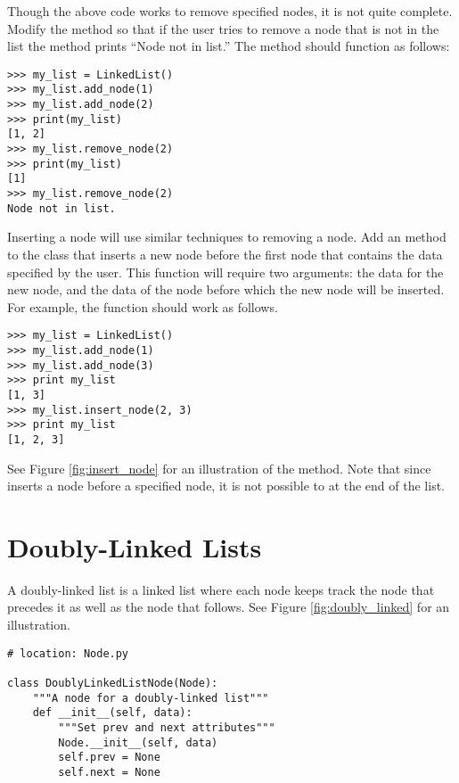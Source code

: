 \begin{problem}
Though the above code works to remove specified nodes, it is not quite complete.
Modify the  method so that if the user tries to remove a node that is not in the list the method prints ``Node not in list.''
The method should function as follows:
\begin{lstlisting}
>>> my_list = LinkedList()
>>> my_list.add_node(1)
>>> my_list.add_node(2)
>>> print(my_list)
[1, 2]
>>> my_list.remove_node(2)
>>> print(my_list)
[1]
>>> my_list.remove_node(2)
Node not in list.
\end{lstlisting}
\end{problem}

\begin{problem}
Inserting a node will use similar techniques to removing a node.
Add an  method to the  class that inserts a new node before the first node that contains the data specified by the user.
This function will require two arguments: the data for the new node, and the data of the node before which the new node will be inserted.
For example, the function should work as follows.
\begin{lstlisting}
>>> my_list = LinkedList()
>>> my_list.add_node(1)
>>> my_list.add_node(3)
>>> print my_list
[1, 3]
>>> my_list.insert_node(2, 3)
>>> print my_list
[1, 2, 3]
\end{lstlisting}
See Figure \ref{fig:insert_node} for an illustration of the  method.
Note that since  inserts a node before a specified node, it is not possible to  at the end of the list.
\end{problem}

\section*{Doubly-Linked Lists}

A doubly-linked list is a linked list where each node keeps track the node that precedes it as well as the node that follows.
See Figure \ref{fig:doubly_linked} for an illustration.

\begin{lstlisting}
# location: Node.py

class DoublyLinkedListNode(Node):
	"""A node for a doubly-linked list"""
	def __init__(self, data):
		"""Set prev and next attributes"""
		Node.__init__(self, data)
		self.prev = None
		self.next = None
\end{lstlisting}


